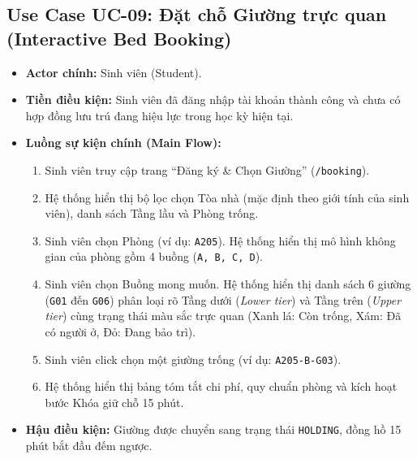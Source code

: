 \subsection{Use Case UC-09: Đặt chỗ Giường trực quan (Interactive Bed Booking)}
\begin{itemize}
    \item \textbf{Actor chính:} Sinh viên (Student).
    \item \textbf{Tiền điều kiện:} Sinh viên đã đăng nhập tài khoản thành công và chưa có hợp đồng lưu trú đang hiệu lực trong học kỳ hiện tại.
    \item \textbf{Luồng sự kiện chính (Main Flow):}
    \begin{enumerate}
        \item Sinh viên truy cập trang ``Đăng ký & Chọn Giường'' (\texttt{/booking}).
        \item Hệ thống hiển thị bộ lọc chọn Tòa nhà (mặc định theo giới tính của sinh viên), danh sách Tầng lầu và Phòng trống.
        \item Sinh viên chọn Phòng (ví dụ: \texttt{A205}). Hệ thống hiển thị mô hình không gian của phòng gồm 4 buồng (\texttt{A, B, C, D}).
        \item Sinh viên chọn Buồng mong muốn. Hệ thống hiển thị danh sách 6 giường (\texttt{G01} đến \texttt{G06}) phân loại rõ Tầng dưới (\textit{Lower tier}) và Tầng trên (\textit{Upper tier}) cùng trạng thái màu sắc trực quan (Xanh lá: Còn trống, Xám: Đã có người ở, Đỏ: Đang bảo trì).
        \item Sinh viên click chọn một giường trống (ví dụ: \texttt{A205-B-G03}).
        \item Hệ thống hiển thị bảng tóm tắt chi phí, quy chuẩn phòng và kích hoạt bước Khóa giữ chỗ 15 phút.
    \end{enumerate}
    \item \textbf{Hậu điều kiện:} Giường được chuyển sang trạng thái \texttt{HOLDING}, đồng hồ 15 phút bắt đầu đếm ngược.
\end{itemize}

